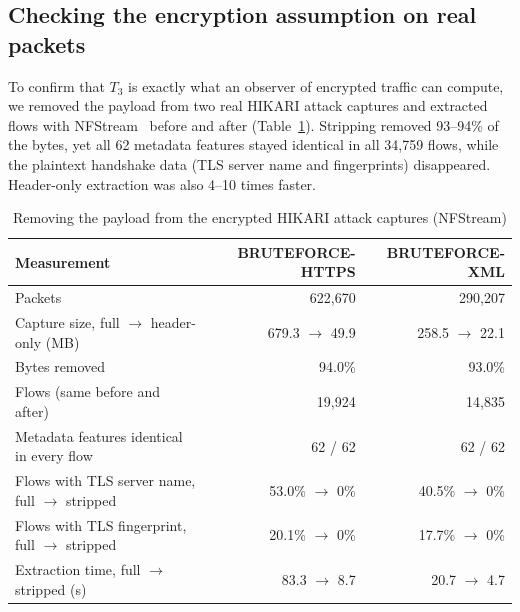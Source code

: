 \subsection{Checking the encryption assumption on real packets}
\label{sec:pcap}
To confirm that $T_3$ is exactly what an observer of encrypted traffic can compute, we removed the payload from two real HIKARI attack captures and extracted flows with NFStream~\cite{nfstream} before and after (Table~\ref{tab:pcap}). Stripping removed 93--94\% of the bytes, yet all 62 metadata features stayed identical in all 34{,}759 flows, while the plaintext handshake data (TLS server name and fingerprints) disappeared. Header-only extraction was also 4--10 times faster.

\begin{table}[!htbp]
\centering
\caption{Removing the payload from the encrypted HIKARI attack captures (NFStream)}
\label{tab:pcap}
\scriptsize
\setlength{\tabcolsep}{4pt}
\begin{tabular}{lrr}
\toprule
\textbf{Measurement} & \textbf{BRUTEFORCE-HTTPS} & \textbf{BRUTEFORCE-XML} \\
\midrule
Packets & 622{,}670 & 290{,}207 \\
Capture size, full $\rightarrow$ header-only (MB) & 679.3 $\rightarrow$ 49.9 & 258.5 $\rightarrow$ 22.1 \\
Bytes removed & 94.0\% & 93.0\% \\
Flows (same before and after) & 19{,}924 & 14{,}835 \\
Metadata features identical in every flow & 62 / 62 & 62 / 62 \\
Flows with TLS server name, full $\rightarrow$ stripped & 53.0\% $\rightarrow$ 0\% & 40.5\% $\rightarrow$ 0\% \\
Flows with TLS fingerprint, full $\rightarrow$ stripped & 20.1\% $\rightarrow$ 0\% & 17.7\% $\rightarrow$ 0\% \\
Extraction time, full $\rightarrow$ stripped (s) & 83.3 $\rightarrow$ 8.7 & 20.7 $\rightarrow$ 4.7 \\
\bottomrule
\end{tabular}
\end{table}

